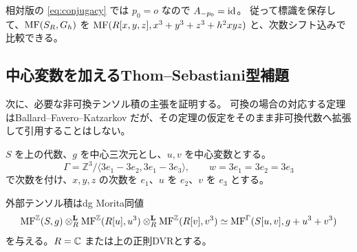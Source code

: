 相対版の \eqref{eq:conjugacy} では $p_0=o$ なので $A_{-p_0}=\operatorname{id}$。
従って標識を保存して、$\operatorname{MF}(S_R,G_h)$ を
$\operatorname{MF}(R[x,y,z],x^3+y^3+z^3+h^2xyz)$ と、次数シフト込みで比較できる。

\subsection{中心変数を加えるThom--Sebastiani型補題}

次に、必要な非可換テンソル積の主張を証明する。
可換の場合の対応する定理はBallard--Favero--Katzarkov\cite[Theorem 5.15, Corollary 5.18]{BFK}
だが、その定理の仮定をそのまま非可換代数へ拡張して引用することはしない。

$S$ を上の代数、$g$ を中心三次元とし、$u,v$ を中心変数とする。
\[
 \Gamma=\mathbb Z^3/\langle3e_1-3e_2,3e_1-3e_3\rangle,
 \qquad w=3e_1=3e_2=3e_3
\]
で次数を付け、$x,y,z$ の次数を $e_1$、$u$ を $e_2$、$v$ を $e_3$ とする。

\begin{lemma}\label{lem:ts}
外部テンソル積はdg Morita同値
\[
 \operatorname{MF}^{\mathbb Z}(S,g)\otimes_R^{\mathbf L}
 \operatorname{MF}^{\mathbb Z}(R[u],u^3)\otimes_R^{\mathbf L}
 \operatorname{MF}^{\mathbb Z}(R[v],v^3)
 \simeq\operatorname{MF}^\Gamma(S[u,v],g+u^3+v^3)
\]
を与える。$R=\mathbb C$ または上の正則DVRとする。
\end{lemma}

